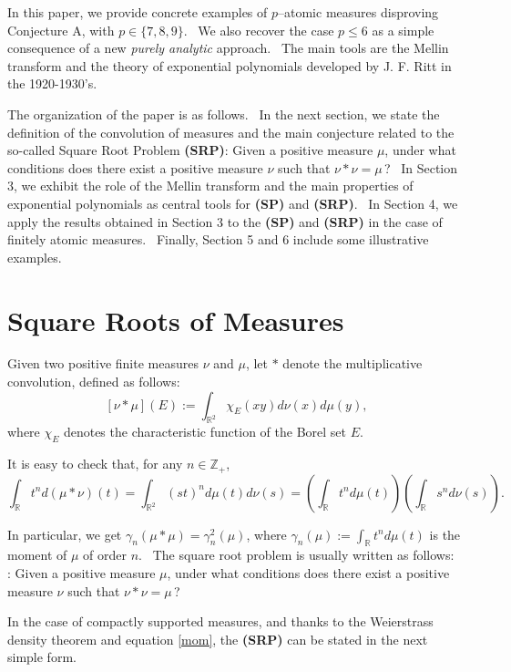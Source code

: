 \documentclass[12pt]{amsart}
\newcommand{\R}{\mathbb{R}}
\newcommand{\Z}{\mathbb{Z}}
\begin{document}
In this paper, we provide concrete examples of $p$--atomic measures disproving  Conjecture A, with $p\in \{7,8,9\}$. \ We also recover the case $p\le 6$ as a simple consequence of a new {\it purely analytic} approach. \ The main tools are the Mellin transform and the theory of exponential polynomials developed by J. F. Ritt in the 1920-1930's. 

The organization of the paper is as follows. \ In the next section, we state the definition of the convolution of measures and the main conjecture related to the so-called Square Root Problem {\bf (SRP)}: Given a positive measure $\mu$, under what conditions does there exist a positive measure $\nu$ such that $\nu*\nu= \mu$\,? \ In  Section 3, we exhibit the role of the Mellin transform and the main properties of exponential polynomials as central tools for {\bf (SP)} and {\bf (SRP)}. \ In Section 4, we apply the results obtained in Section 3 to the {\bf (SP)} and {\bf (SRP)} in the case of finitely atomic measures. \ Finally, Section 5 and 6 include some illustrative examples.

\section{Square Roots of Measures}

Given two positive finite measures $\nu$ and $\mu$, let $*$ denote the multiplicative convolution, defined as follows: 
$$
[\nu*\mu](E):=\int_{\mathbb{R}^2} \chi_E(xy) d\nu(x)d\mu(y),
$$
where $\chi_E$ denotes the characteristic function of the Borel set $E$.

It is easy to check that, for any $n\in \Z_+$,
\begin{equation}\label{mom}
  \int_{\R} t^n d(\mu*\nu)(t)=\int_{\R^2} (st)^n d\mu(t)d\nu(s)  =\left( \int_\R t^n d\mu(t) \right) \left( \int_\R s^n d\nu(s) \right).
\end{equation}

In particular, we get $\gamma_n(\mu*\mu)=\gamma_n^2(\mu)$, where 
$\gamma_n(\mu):= \int_\R t^nd\mu(t)$
is the moment of $\mu$ of order $n$. \ The square root problem is usually written as follows:\\

: Given a positive measure $\mu$, under what conditions does there exist a positive measure $\nu$ such that $\nu*\nu= \mu$\,?

In the case of compactly supported measures, and thanks to the Weierstrass density theorem and equation \eqref{mom}, the {\bf (SRP)} can be stated in the next simple form. \\
\end{document}
